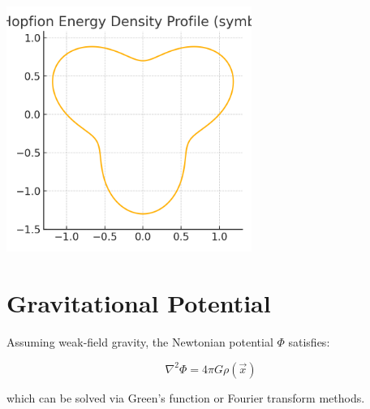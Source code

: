 \documentclass[12pt]{article}
\begin{document}
\begin{center}
\includegraphics[width=0.6\textwidth]{hopfion_profile.png}
\end{center}

\section{Gravitational Potential}
Assuming weak-field gravity, the Newtonian potential \( \Phi \) satisfies:

\[
\nabla^2 \Phi = 4\pi G \rho(\vec{x})
\]

which can be solved via Green’s function or Fourier transform methods.
\end{document}
